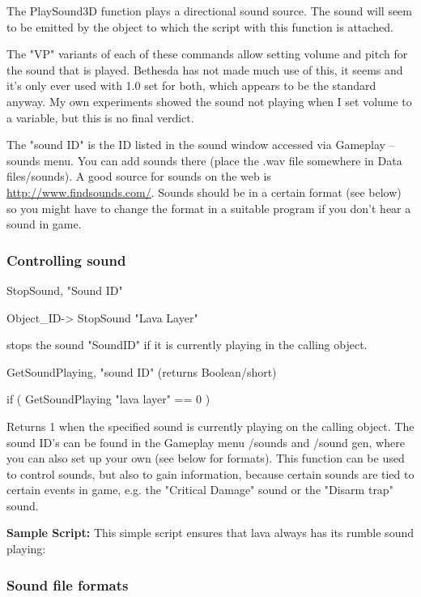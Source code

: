 The PlaySound3D function plays a directional sound source. The sound
will seem to be emitted by the object to which the script with this
function is attached.

The "VP" variants of each of these commands allow setting volume and
pitch for the sound that is played. Bethesda has not made much use of
this, it seems and it's only ever used with 1.0 set for both, which
appears to be the standard anyway. My own experiments showed the sound
not playing when I set volume to a variable, but this is no final
verdict.

The "sound ID" is the ID listed in the sound window accessed via
Gameplay -- sounds menu. You can add sounds there (place the .wav file
somewhere in Data files/sounds). A good source for sounds on the web is
\url{http://www.findsounds.com/}. Sounds should be in a certain format
(see below) so you might have to change the format in a suitable program
if you don't hear a sound in game.

\hypertarget{controlling-sound}{%
\subsubsection{Controlling sound}\label{controlling-sound}}

StopSound, "Sound ID"

Object\_ID-> StopSound "Lava Layer"

stops the sound "SoundID" if it is currently playing in the calling
object.

GetSoundPlaying, "sound ID" (returns Boolean/short)

if ( GetSoundPlaying "lava layer" == 0 )

Returns 1 when the specified sound is currently playing on the calling
object. The sound ID's can be found in the Gameplay menu /sounds and
/sound gen, where you can also set up your own (see below for formats).
This function can be used to control sounds, but also to gain
information, because certain sounds are tied to certain events in game,
e.g. the "Critical Damage" sound or the "Disarm trap" sound.

\textbf{Sample Script:} This simple script ensures that lava always has
its rumble sound playing:



\hypertarget{sound-file-formats}{%
\subsubsection{Sound file formats}\label{sound-file-formats}}

